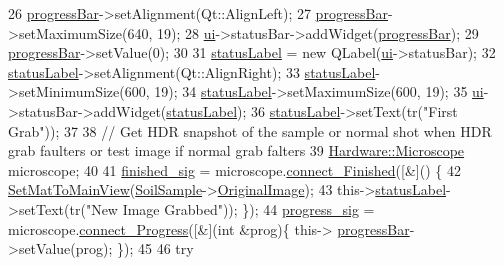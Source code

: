 \begin{DoxyCode}
26     \hyperlink{class_v_s_a_g_u_i_a17b71e08eeff21b28e3816ec5482473c}{progressBar}->setAlignment(Qt::AlignLeft);
27     \hyperlink{class_v_s_a_g_u_i_a17b71e08eeff21b28e3816ec5482473c}{progressBar}->setMaximumSize(640, 19);
28     \hyperlink{class_v_s_a_g_u_i_a7a1d0cb3cf813ff9dce12f7f0ed6cd7a}{ui}->statusBar->addWidget(\hyperlink{class_v_s_a_g_u_i_a17b71e08eeff21b28e3816ec5482473c}{progressBar});
29     \hyperlink{class_v_s_a_g_u_i_a17b71e08eeff21b28e3816ec5482473c}{progressBar}->setValue(0);
30 
31     \hyperlink{class_v_s_a_g_u_i_a8cbaaa3b5e0975b7a1101b9bef3c9b57}{statusLabel} = \textcolor{keyword}{new} QLabel(\hyperlink{class_v_s_a_g_u_i_a7a1d0cb3cf813ff9dce12f7f0ed6cd7a}{ui}->statusBar);
32     \hyperlink{class_v_s_a_g_u_i_a8cbaaa3b5e0975b7a1101b9bef3c9b57}{statusLabel}->setAlignment(Qt::AlignRight);
33     \hyperlink{class_v_s_a_g_u_i_a8cbaaa3b5e0975b7a1101b9bef3c9b57}{statusLabel}->setMinimumSize(600, 19);
34     \hyperlink{class_v_s_a_g_u_i_a8cbaaa3b5e0975b7a1101b9bef3c9b57}{statusLabel}->setMaximumSize(600, 19);
35     \hyperlink{class_v_s_a_g_u_i_a7a1d0cb3cf813ff9dce12f7f0ed6cd7a}{ui}->statusBar->addWidget(\hyperlink{class_v_s_a_g_u_i_a8cbaaa3b5e0975b7a1101b9bef3c9b57}{statusLabel});
36     \hyperlink{class_v_s_a_g_u_i_a8cbaaa3b5e0975b7a1101b9bef3c9b57}{statusLabel}->setText(tr(\textcolor{stringliteral}{"First Grab"}));
37 
38     \textcolor{comment}{// Get HDR snapshot of the sample or normal shot when HDR grab faulters or test image if normal grab
       falters}
39     \hyperlink{class_hardware_1_1_microscope}{Hardware::Microscope} microscope;
40 
41     \hyperlink{class_v_s_a_g_u_i_a670325c6bab3874937f0a9b7e8e3b370}{finished\_sig} = microscope.\hyperlink{class_hardware_1_1_microscope_abc3f008ec7cf00e6ddf31b0a4ed392cb}{connect\_Finished}([&]() \{
42         \hyperlink{class_v_s_a_g_u_i_a988508cf880e27fcd8a029b94e546bcc}{SetMatToMainView}(\hyperlink{class_v_s_a_g_u_i_ac90517c9baea0a75455d43d5eb77d3e7}{SoilSample}->\hyperlink{class_soil_analyzer_1_1_sample_a0d6e6fca9e232a77329daf0b4b29c634}{OriginalImage});
43         this->\hyperlink{class_v_s_a_g_u_i_a8cbaaa3b5e0975b7a1101b9bef3c9b57}{statusLabel}->setText(tr(\textcolor{stringliteral}{"New Image Grabbed"})); \});
44     \hyperlink{class_v_s_a_g_u_i_a3503e0415ff202c93fc4d7ee5c6f4fb8}{progress\_sig} = microscope.\hyperlink{class_hardware_1_1_microscope_abc29f83a2f0ba536df3eb7ccc250b111}{connect\_Progress}([&](\textcolor{keywordtype}{int} &prog)\{ this->
      \hyperlink{class_v_s_a_g_u_i_a17b71e08eeff21b28e3816ec5482473c}{progressBar}->setValue(prog); \});
45 
46     \textcolor{keywordflow}{try}

\end{DoxyCode}
